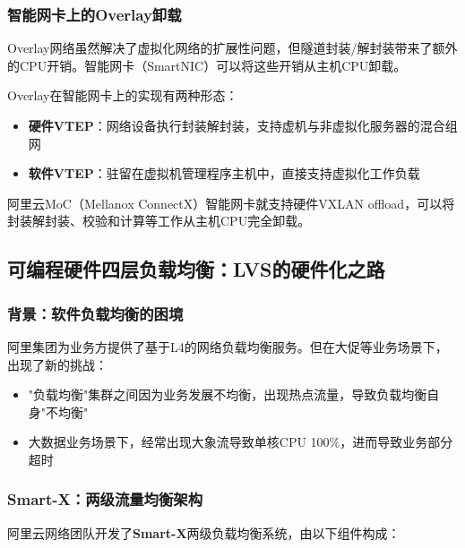 \subsubsection{智能网卡上的Overlay卸载}

Overlay网络虽然解决了虚拟化网络的扩展性问题，但隧道封装/解封装带来了额外的CPU开销。智能网卡（SmartNIC）可以将这些开销从主机CPU卸载。

Overlay在智能网卡上的实现有两种形态：
\begin{itemize}
    \item \textbf{硬件VTEP}：网络设备执行封装解封装，支持虚机与非虚拟化服务器的混合组网
    \item \textbf{软件VTEP}：驻留在虚拟机管理程序主机中，直接支持虚拟化工作负载
\end{itemize}

阿里云MoC（Mellanox ConnectX）智能网卡就支持硬件VXLAN offload，可以将封装解封装、校验和计算等工作从主机CPU完全卸载。

\subsection{可编程硬件四层负载均衡：LVS的硬件化之路}

\subsubsection{背景：软件负载均衡的困境}

阿里集团为业务方提供了基于L4的网络负载均衡服务。但在大促等业务场景下，出现了新的挑战：

\begin{itemize}
    \item "负载均衡"集群之间因为业务发展不均衡，出现热点流量，导致负载均衡自身"不均衡"
    \item 大数据业务场景下，经常出现大象流导致单核CPU 100\%，进而导致业务部分超时
\end{itemize}

\subsubsection{Smart-X：两级流量均衡架构}

阿里云网络团队开发了\textbf{Smart-X}两级负载均衡系统，由以下组件构成：

